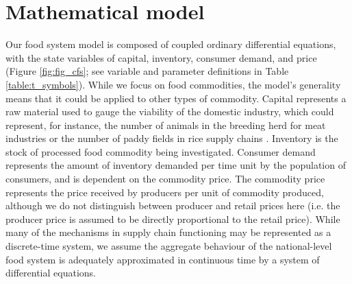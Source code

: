 \documentclass[9pt,twocolumn,twoside,lineno]{pnas-new}
\begin{document}
\section*{Mathematical model}
Our food system model is composed of coupled ordinary differential equations, with the state variables of capital, inventory, consumer demand, and price (Figure \ref{fig:fig_cfs}; see variable and parameter definitions in Table \ref{table:t_symbols}). While we focus on food commodities, the model's generality means that it could be applied to other types of commodity. Capital represents a raw material used to gauge the viability of the domestic industry, which could represent, for instance, the number of animals in the breeding herd for meat industries \cite{meadows1971} or the number of paddy fields in rice supply chains \cite{chung2018}. Inventory is the stock of processed food commodity being investigated. Consumer demand represents the amount of inventory demanded per time unit by the population of consumers, and is dependent on the commodity price. The commodity price represents the price received by producers per unit of commodity produced, although we do not distinguish between producer and retail prices here (i.e. the producer price is assumed to be directly proportional to the retail price). While many of the mechanisms in supply chain functioning may be represented as a discrete-time system, we assume the aggregate behaviour of the national-level food system is adequately approximated in continuous time by a system of differential equations.
\end{document}
